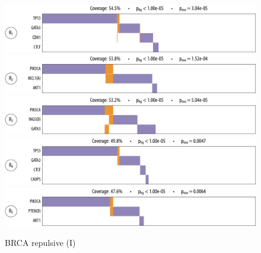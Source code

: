 \begin{figure}[htb]
\centering
\includegraphics[width=\textwidth]{figures/genes/brca_1.pdf}\\[2em]
\includegraphics[width=\textwidth]{figures/genes/brca_6.pdf}\\[2em]
\includegraphics[width=\textwidth]{figures/genes/brca_8.pdf}\\[2em]
\includegraphics[width=\textwidth]{figures/genes/brca_2.pdf}\\[2em]
\includegraphics[width=\textwidth]{figures/genes/brca_5.pdf}\\[2em]
\caption{BRCA repulsive (I)}
\end{figure}

